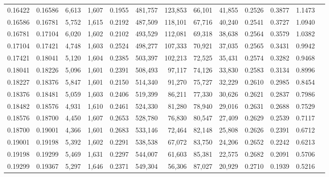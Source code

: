 \begin{tabular}{rrrrrrrrrrrrr}
0.16422 & 0.16586 &  6,613 & 1,607 &                                     0.1955 & 481,757 & 123,853 &  66,101 &  41,855 & 0.2526 & 0.3877 & 1.1473 \\
0.16586 & 0.16781 &  5,752 & 1,615 &                                     0.2192 & 487,509 & 118,101 &  67,716 &  40,240 & 0.2541 & 0.3727 & 1.0940 \\
0.16781 & 0.17104 &  6,020 & 1,602 &                                     0.2102 & 493,529 & 112,081 &  69,318 &  38,638 & 0.2564 & 0.3579 & 1.0382 \\
0.17104 & 0.17421 &  4,748 & 1,603 &                                     0.2524 & 498,277 & 107,333 &  70,921 &  37,035 & 0.2565 & 0.3431 & 0.9942 \\
0.17421 & 0.18041 &  5,120 & 1,604 &                                     0.2385 & 503,397 & 102,213 &  72,525 &  35,431 & 0.2574 & 0.3282 & 0.9468 \\
0.18041 & 0.18226 &  5,096 & 1,601 &                                     0.2391 & 508,493 &  97,117 &  74,126 &  33,830 & 0.2583 & 0.3134 & 0.8996 \\
0.18227 & 0.18376 &  5,847 & 1,601 &                                     0.2150 & 514,340 &  91,270 &  75,727 &  32,229 & 0.2610 & 0.2985 & 0.8454 \\
0.18376 & 0.18481 &  5,059 & 1,603 &                                     0.2406 & 519,399 &  86,211 &  77,330 &  30,626 & 0.2621 & 0.2837 & 0.7986 \\
0.18482 & 0.18576 &  4,931 & 1,610 &                                     0.2461 & 524,330 &  81,280 &  78,940 &  29,016 & 0.2631 & 0.2688 & 0.7529 \\
0.18576 & 0.18700 &  4,450 & 1,607 &                                     0.2653 & 528,780 &  76,830 &  80,547 &  27,409 & 0.2629 & 0.2539 & 0.7117 \\
0.18700 & 0.19001 &  4,366 & 1,601 &                                     0.2683 & 533,146 &  72,464 &  82,148 &  25,808 & 0.2626 & 0.2391 & 0.6712 \\
0.19001 & 0.19198 &  5,392 & 1,602 &                                     0.2291 & 538,538 &  67,072 &  83,750 &  24,206 & 0.2652 & 0.2242 & 0.6213 \\
0.19198 & 0.19299 &  5,469 & 1,631 &                                     0.2297 & 544,007 &  61,603 &  85,381 &  22,575 & 0.2682 & 0.2091 & 0.5706 \\
0.19299 & 0.19367 &  5,297 & 1,646 &                                     0.2371 & 549,304 &  56,306 &  87,027 &  20,929 & 0.2710 & 0.1939 & 0.5216 \\

\end{tabular}
